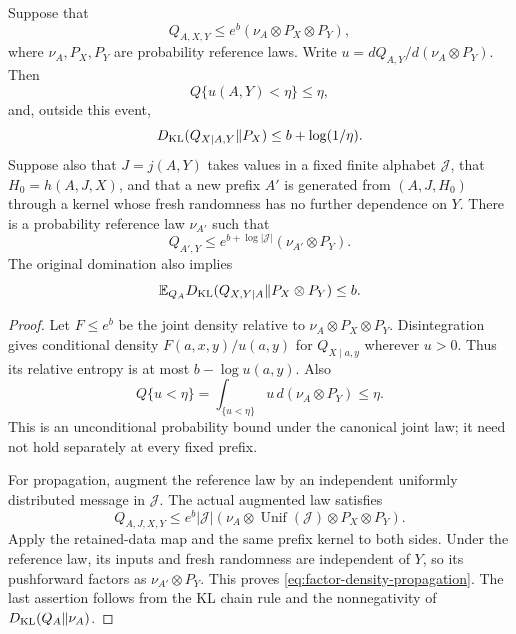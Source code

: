 \begin{lemma}
\label{lem:factor-density}
Suppose that
\[
 Q_{A,X,Y}\le e^b(\nu_A\otimes P_X\otimes P_Y),
\]
where $\nu_A,P_X,P_Y$ are probability reference laws. Write
$u=dQ_{A,Y}/d(\nu_A\otimes P_Y)$. Then
\[
 Q\{u(A,Y)<\eta\}\le\eta,
\]
and, outside this event,
\begin{equation}\label{eq:factor-conditional-entropy}
 D_{\rm KL}(Q_{X\mid A,Y}\Vert P_X)
       \le b+\log(1/\eta).
\end{equation}
Suppose also that $J=j(A,Y)$ takes values in a fixed finite alphabet
$\mathcal J$, that $H_0=h(A,J,X)$, and that a new prefix $A'$ is generated
from $(A,J,H_0)$ through a kernel whose fresh randomness has no further
dependence on $Y$. There is a probability reference law $\nu_{A'}$ such
that
\begin{equation}\label{eq:factor-density-propagation}
 Q_{A',Y}\le e^{b+\log|\mathcal J|}
                            (\nu_{A'}\otimes P_Y).
\end{equation}
The original domination also implies
\[
 \mathbb E_{Q_A}D_{\rm KL}(Q_{X,Y\mid A}\Vert P_X\otimes P_Y)\le b.
\]
\end{lemma}
\begin{proof}
Let $F\le e^b$ be the joint density relative to
$\nu_A\otimes P_X\otimes P_Y$. Disintegration gives conditional density
$F(a,x,y)/u(a,y)$ for $Q_{X\mid a,y}$ wherever $u>0$.
Thus its relative entropy is at most $b-\log u(a,y)$.
Also
\[
 Q\{u<\eta\}=
 \int_{\{u<\eta\}}u\,d(\nu_A\otimes P_Y)\le\eta.
\]
This is an unconditional probability bound under the canonical joint law;
it need not hold separately at every fixed prefix.

For propagation, augment the reference law by an independent uniformly
distributed message in $\mathcal J$. The actual augmented law satisfies
\[
 Q_{A,J,X,Y}\le e^b|\mathcal J|
  (\nu_A\otimes\operatorname{Unif}(\mathcal J)
                       \otimes P_X\otimes P_Y).
\]
Apply the retained-data map and the same prefix kernel to both sides.
Under the reference law, its inputs and fresh randomness are independent
of $Y$, so its pushforward factors as $\nu_{A'}\otimes P_Y$.
This proves \eqref{eq:factor-density-propagation}. The last assertion
follows from the KL chain rule and the nonnegativity of
$D_{\rm KL}(Q_A\Vert\nu_A)$.
\end{proof}



